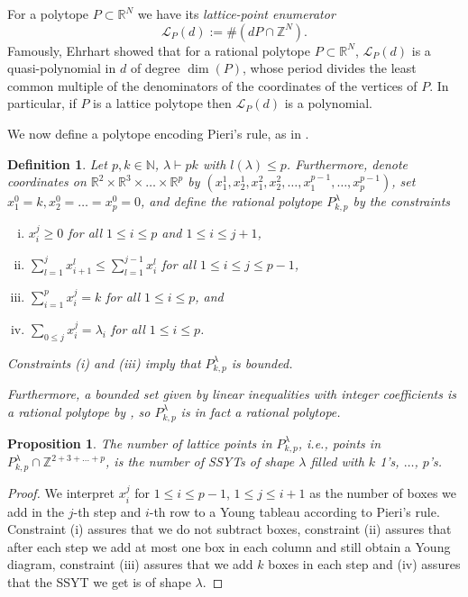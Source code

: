 \documentclass[a4paper]{amsart}
\newtheorem{proposition}{Proposition}
\newtheorem{definition}{Definition}
\def\R{{\mathbb{R}}}
\def\N{{\mathbb{N}}}
\def\Z{{\mathbb{Z}}}
\begin{document}
	For a polytope $P\subset\R^N$ we have its \textit{lattice-point enumerator}
	\begin{displaymath}
		\mathcal{L}_P(d):=\#(dP\cap\Z^N).
	\end{displaymath}
	Famously, Ehrhart showed that for a rational polytope $P\subset\R^N$, $\mathcal{L}_P(d)$ is a quasi-polynomial in $d$ of degree $\dim(P)$,
	whose period divides the least common multiple of the denominators of the coordinates of the vertices of $P$.
	In particular, if $P$ is a lattice polytope then $\mathcal{L}_P(d)$ is a polynomial.
	
We now define a polytope encoding Pieri's rule, as in \cite[Def. 3.3, Prop. 3.4]{KM16}.
\begin{definition}
	Let $p,k\in\N$, $\lambda\vdash pk$ with $l(\lambda)\leq p$.
	Furthermore, denote coordinates on $\R^2\times\R^3\times\ldots\times\R^{p}$ by $(x_1^1,x_2^1,x_1^2,x_2^2,\ldots,x_1^{p-1},\ldots,x_{p}^{p-1})$, set $x_1^0=k, x_2^0=\ldots=x_{p}^0=0$,
	and define the rational polytope $P_{k,p}^{\lambda}$ by the constraints
	\begin{enumerate}[(i)]
		\item
			$x_i^j\geq 0$ for all $1\leq i\leq p$ and $1\leq i\leq j+1$,
		\item
			$\sum\limits_{l=1}^jx_{i+1}^l\leq\sum\limits_{l=1}^{j-1}x_{i}^l$ for all $1\leq i\leq j\leq p-1$,
		\item
			$\sum\limits_{i=1}^px^j_i=k$ for all $1\leq i\leq p$, and
		\item
			$\sum\limits_{0\leq j}x_i^j=\lambda_i$ for all $1\leq i\leq p$.
	\end{enumerate}
	Constraints (i) and (iii) imply that $P_{k,p}^\lambda$ is bounded.
	
	Furthermore,
	a bounded set given by linear inequalities with integer coefficients is a rational polytope by \cite[48]{BR15}, so $P_{k,p}^\lambda$ is in fact a rational polytope.
\end{definition}
\begin{proposition}\label{tensorasymp:prop1a}
	The number of lattice points in $P_{k,p}^\lambda$, i.e., points in $P_{k,p}^\lambda\cap\Z^{2+3+\ldots+p}$, is the number of SSYTs of shape $\lambda$ filled with $k$ 1's, $\ldots$, $p$'s.
\end{proposition}
\begin{proof}
	We interpret $x_i^j$ for $1\leq i\leq p-1$, $1\leq j\leq i+1$ as the number of boxes we add in the $j$-th step and $i$-th row to a Young tableau according to Pieri's rule.
	Constraint (i) assures that we do not subtract boxes, constraint (ii) assures that after each step we add at most one box in each column and still obtain a Young diagram,
	constraint (iii) assures that we add $k$ boxes in each step and (iv) assures that the SSYT we get is of shape $\lambda$.
\end{proof}
\end{document}

